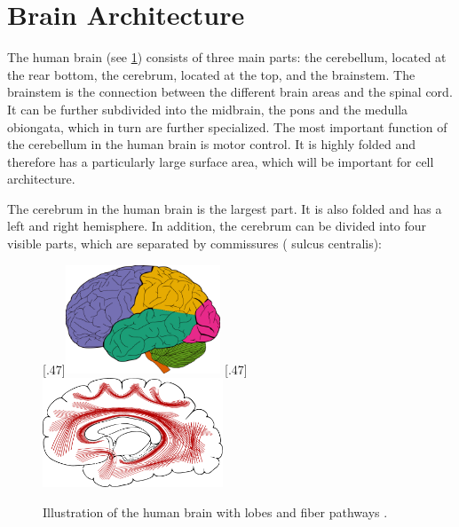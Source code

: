 \section{Brain Architecture}
%
The human brain (see \cref{fig:humanBrain}) consists of three main parts: the cerebellum, located at the rear bottom, the cerebrum, located at the top, and the brainstem.
The brainstem is the connection between the different brain areas and the spinal cord.
It can be further subdivided into the midbrain, the pons and the medulla obiongata, which in turn are further specialized.
The most important function of the cerebellum in the human brain is motor control.
It is highly folded and therefore has a particularly large surface area, which will be important for cell architecture.
\par
%
The cerebrum in the human brain is the largest part.
It is also folded and has a left and right hemisphere.
In addition, the cerebrum can be divided into four visible parts, which are separated by commissures (\eg{} sulcus centralis):
%
\begin{figure}[!t]
\centering
[.47\textwidth]{\includegraphics[height=3.25cm]{gfx/neuroanatomy/brain_lobes.pdf}}
\hspace*{\fill}
[.47\textwidth]{\includegraphics[height=3.25cm]{gfx/neuroanatomy/brain_fiber_paths.pdf}}
\caption{Illustration of the human brain with lobes  and fiber pathways .}
\label{fig:humanBrain}
\end{figure}
